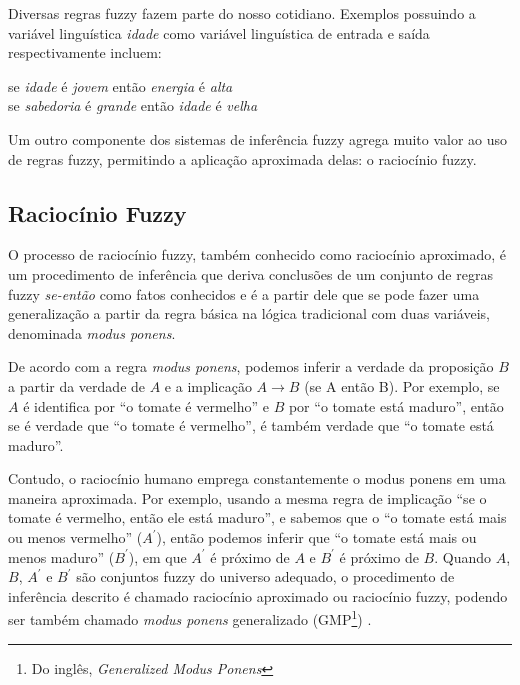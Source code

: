 Diversas regras fuzzy fazem parte do nosso cotidiano. Exemplos possuindo a variável linguística \textit{idade} como variável linguística de entrada e saída respectivamente incluem:
\begin{center}
se \textit{idade} é \textit{jovem} então \textit{energia} é \textit{alta} \\
se \textit{sabedoria} é \textit{grande} então \textit{idade} é \textit{velha}
\end{center}

Um outro componente dos sistemas de inferência fuzzy agrega muito valor ao uso de regras fuzzy, permitindo a aplicação aproximada delas: o raciocínio fuzzy.

\subsection{Raciocínio Fuzzy}
\label{sec:raciocinio_fuzzy}

O processo de raciocínio fuzzy, também conhecido como raciocínio aproximado, é um procedimento de inferência que deriva conclusões de um conjunto de regras fuzzy \textit{se-então} como fatos conhecidos \cite[p.~62]{Jang1997} e é a partir dele que se pode fazer uma generalização a partir da regra básica na lógica tradicional com duas variáveis, denominada \textit{modus ponens}.

De acordo com a regra \textit{modus ponens}, podemos inferir a verdade da proposição $B$ a partir da verdade de $A$ e a implicação $A \rightarrow B$ (se A então B). Por exemplo, se $A$ é identifica por ``o tomate é vermelho'' e $B$ por ``o tomate está maduro'', então se é verdade que ``o tomate é vermelho'', é também verdade que ``o tomate está maduro''.

Contudo, o raciocínio humano emprega constantemente o modus ponens em uma maneira aproximada. Por exemplo, usando a mesma regra de implicação ``se o tomate é vermelho, então ele está maduro'', e sabemos que o ``o tomate está mais ou menos vermelho'' ($A^\prime$), então podemos inferir que ``o tomate está mais ou menos maduro'' ($B^\prime$), em que $A^\prime$ é próximo de $A$ e $B^\prime$ é próximo de $B$. Quando $A$, $B$, $A^\prime$ e $B^\prime$ são conjuntos fuzzy do universo adequado, o procedimento de inferência descrito é chamado raciocínio aproximado ou raciocínio fuzzy, podendo ser também chamado \textit{modus ponens} generalizado (GMP\footnote{Do inglês, \textit{Generalized Modus Ponens}}) \cite[p.~65]{Jang1997}.

